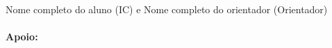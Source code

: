 \section*{\color{blue}{NSIRA O TÍTULO DO SEU ARTIGO}}
Nome completo do aluno (IC) e Nome completo do orientador (Orientador) \\ \\
\textbf{Apoio:}